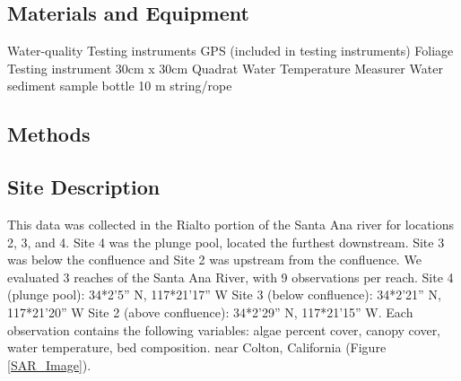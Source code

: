 \documentclass{article}
\begin{document}
\subsection{Materials and Equipment}

Water-quality Testing instruments GPS (included in testing instruments) Foliage Testing instrument 30cm x 30cm Quadrat Water Temperature Measurer Water sediment sample bottle 10 m string/rope


\subsection{Methods}


\subsection{Site Description}
This data was collected in the Rialto portion of the Santa Ana river for locations 2, 3, and 4. Site 4 was the plunge pool, located the furthest downstream. Site 3 was below the confluence and Site 2 was upstream from the confluence. 
We evaluated 3 reaches of the Santa Ana River, with 9 observations per reach. Site 4 (plunge pool): 34*2’5” N, 117*21’17” W Site 3 (below conﬂuence): 34*2’21” N, 117*21’20” W Site 2 (above conﬂuence): 34*2’29” N, 117*21’15” W. Each observation contains the following variables: algae percent cover, canopy cover, water temperature, bed composition. near Colton, California (Figure \ref{SAR_Image}). 
\end{document}
